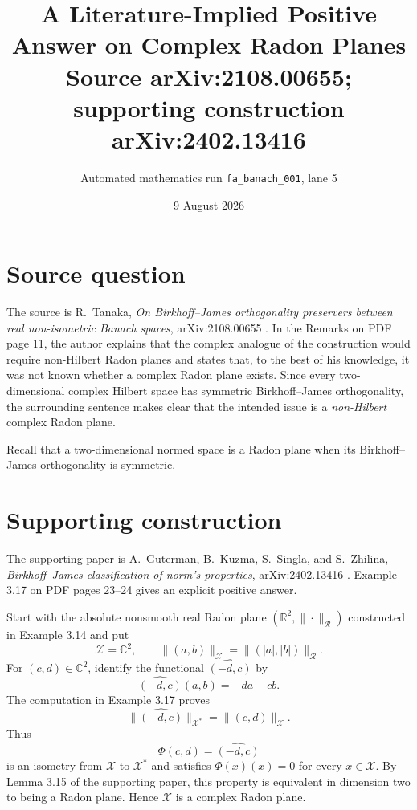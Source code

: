 \documentclass[11pt]{article}
\title{A Literature-Implied Positive Answer on Complex Radon Planes\\
\large Source arXiv:2108.00655; supporting construction arXiv:2402.13416}
\author{Automated mathematics run \texttt{fa\_banach\_001}, lane 5}
\date{9 August 2026}
\begin{document}
\maketitle

\begin{center}
\end{center}

\section*{Source question}

The source is R.~Tanaka, \emph{On Birkhoff--James orthogonality preservers
between real non-isometric Banach spaces}, arXiv:2108.00655
\cite{Tanaka}.  In the Remarks on PDF page 11, the author explains that the
complex analogue of the construction would require non-Hilbert Radon planes
and states that, to the best of his knowledge, it was not known whether a
complex Radon plane exists.  Since every two-dimensional complex Hilbert
space has symmetric Birkhoff--James orthogonality, the surrounding sentence
makes clear that the intended issue is a \emph{non-Hilbert} complex Radon
plane.

Recall that a two-dimensional normed space is a Radon plane when its
Birkhoff--James orthogonality is symmetric.

\section*{Supporting construction}

The supporting paper is A.~Guterman, B.~Kuzma, S.~Singla, and S.~Zhilina,
\emph{Birkhoff--James classification of norm's properties},
arXiv:2402.13416 \cite{GKSSZ}.  Example 3.17 on PDF pages 23--24 gives an
explicit positive answer.

Start with the absolute nonsmooth real Radon plane
$(\mathbb R^2,\|\cdot\|_{\mathcal R})$ constructed in Example 3.14 and put
\[
 \mathcal X=\mathbb C^2,
 \qquad
 \|(a,b)\|_{\mathcal X}
 =\|(|a|,|b|)\|_{\mathcal R}.
\]
For $(c,d)\in\mathbb C^2$, identify the functional
$\widehat{(-d,c)}$ by
\[
 \widehat{(-d,c)}(a,b)=-da+cb.
\]
The computation in Example 3.17 proves
\[
 \|\widehat{(-d,c)}\|_{\mathcal X^*}=\|(c,d)\|_{\mathcal X}.
\]
Thus
\[
 \Phi(c,d)=\widehat{(-d,c)}
\]
is an isometry from $\mathcal X$ to $\mathcal X^*$ and satisfies
$\Phi(x)(x)=0$ for every $x\in\mathcal X$.  By Lemma 3.15 of the supporting
paper, this property is equivalent in dimension two to being a Radon plane.
Hence $\mathcal X$ is a complex Radon plane.
\end{document}
